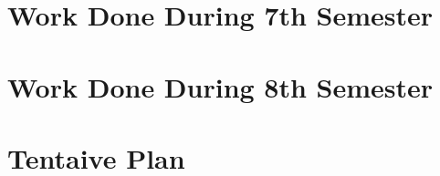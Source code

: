 \documentclass[12pt, a4paper,twoside]{article}
\begin{document}
\section{Work Done During 7th Semester}


\clearpage

\section{Work Done During 8th Semester}

\clearpage

\section{Tentaive Plan}

\clearpage
\begin{singlespacing}
{



}
\end{singlespacing}
\end{document}
